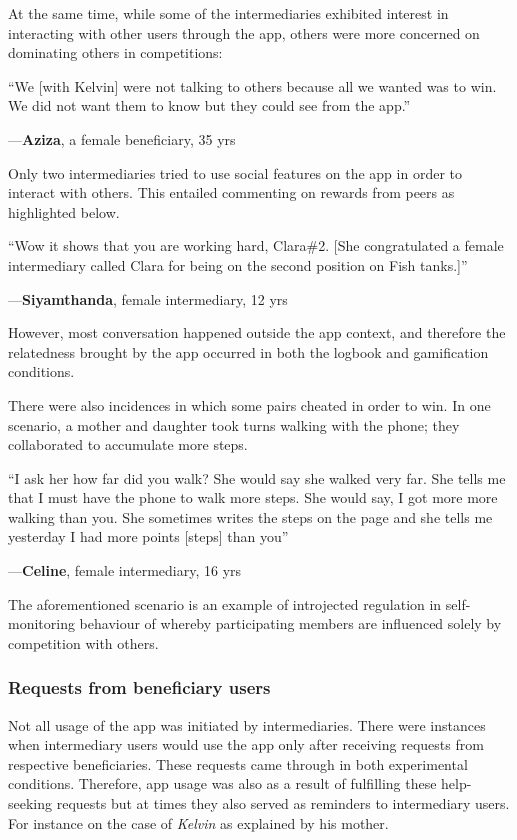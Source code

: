 \documentclass{sig-alternate}
\newenvironment{myquote}
               {\list{}{\rightmargin   \leftmargin
                        \parsep        0in }%
                \item\relax}
               {\endlist}
\newcommand{\userquote}[2]{\begin{samepage}\begin{myquote} 
     \em{\small{#2\begin{flushright}---#1\end{flushright}}}
   \end{myquote}\end{samepage}}
\begin{document}
At the same time, while some of the intermediaries exhibited interest in interacting with other users through the app, others were more concerned on dominating others in competitions:

\userquote{\textbf{Aziza}, a female beneficiary, 35 yrs} {``We [with Kelvin] were not talking to others because all we wanted was to win. We did not want them to know but they could see from the app.''}
 
Only two intermediaries tried to use social features on the app in order to interact with others. This entailed commenting on rewards from peers as highlighted below.


\userquote{\textbf{Siyamthanda}, female intermediary, 12 yrs } {``Wow it shows that you are working hard, Clara\#2. [She congratulated a female intermediary called Clara for being on the second position on Fish tanks.]''} 

However, most conversation happened outside the app context, and therefore the relatedness brought by the app occurred in both the logbook and gamification conditions.

There were also incidences in which some pairs cheated in order to win. In one scenario, a mother and daughter took turns walking with the phone; they collaborated to accumulate more steps. 

\userquote{\textbf{Celine}, female intermediary, 16 yrs} {``I ask her how far did you walk?  She would say she walked very far. She tells me that I must have the phone to walk more steps. She would say, I got more more walking than you. She sometimes writes the steps on the page and she tells me yesterday I had more points [steps] than you''}   

The aforementioned scenario is an example of introjected regulation in self-monitoring behaviour of whereby participating members are influenced solely by competition with others.

\subsubsection*{\textbf{Requests from beneficiary users}}
Not all usage of the app was initiated by intermediaries. There were instances when intermediary users would use the app only after receiving requests from respective beneficiaries. These requests came through in both experimental conditions. Therefore, app usage was also as a result of fulfilling these help-seeking requests but at times they also served as reminders to intermediary users. For instance on the case of \emph{Kelvin} as explained by his mother.
\end{document}
